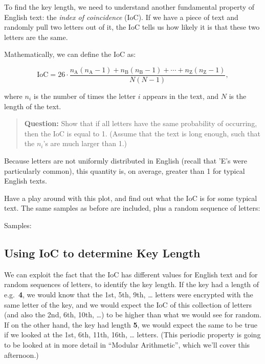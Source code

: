 \documentclass[
  letterpaper,
  DIV=11,
  numbers=noendperiod]{scrreprt}
\begin{document}
To find the key length, we need to understand another fundamental
property of English text: the \emph{index of coincidence} (IoC). If we
have a piece of text and randomly pull two letters out of it, the IoC
tells us how likely it is that these two letters are the same.

Mathematically, we can define the IoC as:

\[\text{IoC} = 26 \cdot \frac{n_\text{A}(n_\text{A} - 1) + n_\text{B}(n_\text{B} - 1) + \cdots + n_\text{Z}(n_\text{Z} - 1)}{N(N - 1)},\]

where \(n_i\) is the number of times the letter \(i\) appears in the
text, and \(N\) is the length of the text.

\begin{quote}
\textbf{Question:} Show that if all letters have the same probability of
occurring, then the IoC is equal to 1. (Assume that the text is long
enough, such that the \(n_i\)'s are much larger than 1.)
\end{quote}

Because letters are not uniformly distributed in English (recall that
'E's were particularly common), this quantity is, on average, greater
than 1 for typical English texts.

Have a play around with this plot, and find out what the IoC is for some
typical text. The same samples as before are included, plus a random
sequence of letters:

\leavevmode{}%
Samples:

\hypertarget{container}{}
\hypertarget{content}{}

\hypertarget{plot}{}

\hypertarget{using-ioc-to-determine-key-length}{%
\subsection{Using IoC to determine Key
Length}\label{using-ioc-to-determine-key-length}}

We can exploit the fact that the IoC has different values for English
text and for random sequences of letters, to identify the key length. If
the key had a length of e.g.~\textbf{4}, we would know that the 1st,
5th, 9th, \ldots{} letters were encrypted with the same letter of the
key, and we would expect the IoC of this collection of letters (and also
the 2nd, 6th, 10th, \ldots) to be higher than what we would see for
random. If on the other hand, the key had length \textbf{5}, we would
expect the same to be true if we looked at the 1st, 6th, 11th, 16th,
\ldots{} letters. (This periodic property is going to be looked at in
more detail in ``Modular Arithmetic'', which we'll cover this
afternoon.)
\end{document}
